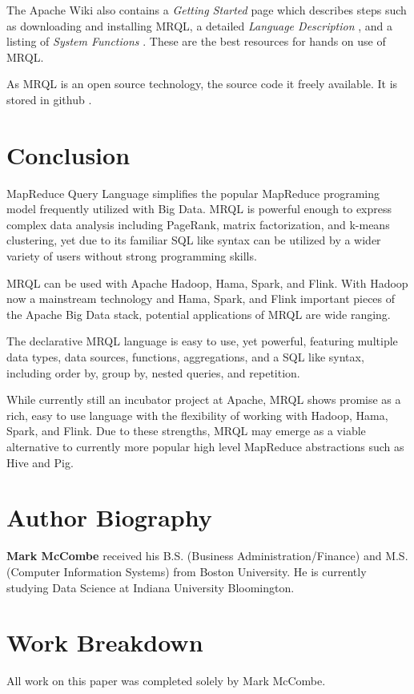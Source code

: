 \documentclass[9pt,twocolumn,twoside]{../../styles/osajnl}
\begin{document}
The Apache Wiki also contains a \emph{Getting Started} page \cite{www-wikiastart} which describes steps such as downloading and installing MRQL, a detailed \emph{Language Description} \cite{www-wikilanguage}, and a listing of \emph{System Functions} \cite{www-wikifunctions}.  These are the best resources for hands on use of MRQL.

As MRQL is an open source technology, the source code it freely available.  It is stored in github \cite{www-gitmrql}.


\section{Conclusion}

MapReduce Query Language simplifies the popular MapReduce programing model frequently utilized with Big Data.  MRQL is powerful enough to express complex data analysis including PageRank, matrix factorization, and k-means clustering, yet due to its familiar SQL like syntax can be utilized by a wider variety of users without strong programming skills.

MRQL can be used with Apache Hadoop, Hama, Spark, and Flink. With Hadoop now a mainstream technology and Hama, Spark, and Flink important pieces of the Apache Big Data stack, potential applications of MRQL are wide ranging.

The declarative MRQL language is easy to use, yet powerful, featuring multiple data types, data sources, functions, aggregations, and a SQL like syntax, including order by, group by, nested queries, and repetition. 

While currently still an incubator project at Apache, MRQL shows promise as a rich, easy to use language with the flexibility of working with Hadoop, Hama, Spark, and Flink.  Due to these strengths, MRQL may emerge as a viable alternative to currently more popular high level MapReduce abstractions such as Hive and Pig.




 
\section*{Author Biography}
\begingroup
\setlength\intextsep{0pt}
\begin{minipage}[t][3.2cm][t]{1.0\columnwidth} %
  \noindent
  {\bfseries Mark McCombe} received his B.S. (Business Administration/Finance) and M.S. (Computer Information Systems) from Boston University.  He is currently studying Data Science at Indiana University Bloomington.
\end{minipage}
\endgroup

\newpage

\appendix

\section{Work Breakdown}

All work on this paper was completed solely by Mark McCombe.
\end{document}
